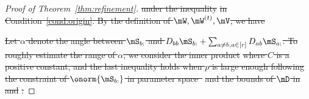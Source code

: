 \documentclass[lettersize,onecolumn,journal]{IEEEtran}
\theoremstyle{definition}
\theoremstyle{definition}
\newcommand{\off}[1]{\left[#1\right]}
\newcommand{\offf}[1]{\left\{#1\right\}}
\newcommand{\ang}[1]{\left\langle#1\right\rangle}
\providecommand{\DIFdeltex}[1]{{\protect\color{red}\sout{#1}}}                      %
\providecommand{\DIFdel}[1]{\texorpdfstring{\DIFdeltex{#1}}{}} %
\begin{document}
\begin{proof}[Proof of Theorem~\ref{thm:refinement}]
\DIFdel{under the inequality }%
\DIFdel{in Condition~\ref{cond:origin}. By the definition of $\mW,\mW^{(t)},\mV$, we have 
    }%

\DIFdel{Let $\alpha$ denote the angle between $\mS_{b:}$ and $D_{bb} \mS_{b:} + \sum_{a \neq b, a \in [r]} D_{ab} \mS_{a:}$. To roughly estimate the range of $\alpha$, we consider the inner product 
    }%
\DIFdel{where $C$ is a positive constant, and the last inequality holds when $p$ is large enough following the constraint of $\onorm{\mS_{b:}}$ in parameter space~}%
\DIFdel{and the bounds of $\mD$ in }%
\DIFdel{and }%
\DIFdel{.
    }%


\end{proof}
\end{document}
